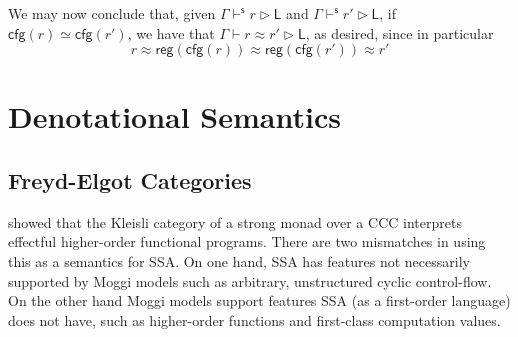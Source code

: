 \documentclass[acmsmall,screen,review]{acmart}
\newcommand{\ms}[1]{\ensuremath{\mathsf{#1}}}
\newcommand{\shaslb}[3]{#1 \vdash^{\ms{s}} #2 \rhd #3}
\newcommand{\teqv}{\approx}
\newcommand{\lbeq}[4]{#1 \vdash #2 \teqv #3 \rhd {#4}}
\newcommand{\tocfg}[1]{\ms{cfg}(#1)}
\newcommand{\toreg}[1]{\ms{reg}(#1)}
\begin{document}
We may now conclude that, given $\shaslb{\Gamma}{r}{\ms{L}}$ and $\shaslb{\Gamma}{r'}{\ms{L}}$, if
$\tocfg{r} \simeq \tocfg{r'}$, we have that $\lbeq{\Gamma}{r}{r'}{\ms{L}}$, as desired, since in
particular
\begin{equation}
  r \teqv \toreg{\tocfg{r}} \teqv \toreg{\tocfg{r'}} \teqv r'
\end{equation}

\section{Denotational Semantics}

\label{sec:densem}

\subsection{Freyd-Elgot Categories}

\citet{moggi-91-monad} showed that the Kleisli category of a strong monad over a CCC interprets
effectful higher-order functional programs. There are two mismatches in using this as a semantics
for SSA. 
%
On one hand, SSA has features not necessarily supported by Moggi models such as arbitrary,
unstructured cyclic control-flow. 
%
On the other hand Moggi models support features SSA (as a first-order language) does not have, such
as higher-order functions and first-class computation values.
\end{document}
